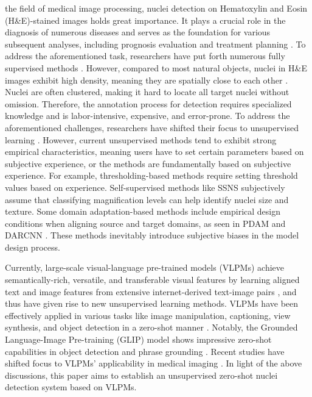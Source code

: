 \documentclass[journal,twoside,web]{ieeecolor}
\begin{document}
 the field of medical image processing, nuclei detection on Hematoxylin and Eosin (H\&E)-stained images holds great importance. It plays a crucial role in the diagnosis of numerous diseases and serves as the foundation for various subsequent analyses, including prognosis evaluation and treatment planning \cite{gleason1992histologic}. To address the aforementioned task, researchers have put forth numerous fully supervised methods \cite{mahanta2021ihc,graham2019hover,yi2019multi}. However, compared to most natural objects, nuclei in H\&E images exhibit high density, meaning they are spatially close to each other \cite{zhou2023cyclic}. Nuclei are often clustered, making it hard to locate all target nuclei without omission. Therefore, the annotation process for detection requires specialized knowledge and is labor-intensive, expensive, and error-prone. To address the aforementioned challenges, researchers have shifted their focus to unsupervised learning \cite{mouelhi2018fast,sahasrabudhe2020self, le2022unsupervised}. However, current unsupervised methods tend to exhibit strong empirical characteristics, meaning users have to set certain parameters based on subjective experience, or the methods are fundamentally based on subjective experience. For example, thresholding-based methods \cite{jiao2006improved,mouelhi2018fast} require setting threshold values based on experience. Self-supervised methods like SSNS \cite{sahasrabudhe2020self} subjectively assume that classifying magnification levels can help identify nuclei size and texture. Some domain adaptation-based methods \cite{le2022unsupervised} include empirical design conditions when aligning source and target domains, as seen in PDAM \cite{liu2020pdam} and DARCNN \cite{hsu2021darcnn}. These methods inevitably introduce subjective biases in the model design process. 


Currently, large-scale visual-language pre-trained models (VLPMs) achieve semantically-rich, versatile, and transferable visual features by learning aligned text and image features from extensive internet-derived text-image pairs \cite{radford2021learning}, and thus have given rise to new unsupervised learning methods. VLPMs have been effectively applied in various tasks like image manipulation, captioning, view synthesis, and object detection in a zero-shot manner \cite{patashnik2021styleclip, li2022blip, jain2021putting, li2022grounded}. Notably, the Grounded Language-Image Pre-training (GLIP) model shows impressive zero-shot capabilities in object detection and phrase grounding \cite{li2022grounded}. Recent studies have shifted focus to VLPMs' applicability in medical imaging \cite{liu2021medical,lu2023visual,wu2023zeroshot}. In light of the above discussions, this paper aims to establish an unsupervised zero-shot nuclei detection system based on VLPMs.
\end{document}
